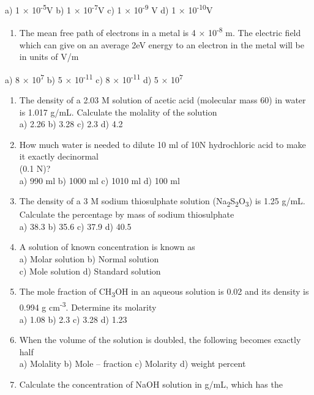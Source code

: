 a) 1 × 10\textsuperscript{-5}V b) 1 × 10\textsuperscript{-7}V c) 1 ×
10\textsuperscript{-9} V d) 1 × 10\textsuperscript{-10}V

\begin{enumerate}
\def\labelenumi{\arabic{enumi}.}
\setcounter{enumi}{43}
\item
  The mean free path of electrons in a metal is 4 ×
  10\textsuperscript{-8} m. The electric field which can give on an
  average 2eV energy to an electron in the metal will be in units of V/m
\end{enumerate}

a) 8 × 10\textsuperscript{7} b) 5 × 10\textsuperscript{-11} c) 8 ×
10\textsuperscript{-11} d) 5 × 10\textsuperscript{7}

\begin{enumerate}
\def\labelenumi{\arabic{enumi}.}
\setcounter{enumi}{45}
\item
  The density of a 2.03 M solution of acetic acid (molecular mass 60) in
  water is 1.017 g/mL. Calculate the molality of the solution\\
  a) 2.26 b) 3.28 c) 2.3 d) 4.2
\item
  How much water is needed to dilute 10 ml of 10N hydrochloric acid to
  make it exactly decinormal\\
  (0.1 N)?\\
  a) 990 ml b) 1000 ml c) 1010 ml d) 100 ml
\item
  The density of a 3 M sodium thiosulphate solution
  (Na\textsubscript{2}S\textsubscript{2}O\textsubscript{3}) is 1.25
  g/mL. Calculate the percentage by mass of sodium thiosulphate\\
  a) 38.3 b) 35.6 c) 37.9 d) 40.5
\item
  A solution of known concentration is known as\\
  a) Molar solution b) Normal solution\\
  c) Mole solution d) Standard solution
\item
  The mole fraction of CH\textsubscript{3}OH in an aqueous solution is
  0.02 and its density is 0.994 g cm\textsuperscript{-3}. Determine its
  molarity\\
  a) 1.08 b) 2.3 c) 3.28 d) 1.23
\item
  When the volume of the solution is doubled, the following becomes
  exactly half\\
  a) Molality b) Mole -- fraction c) Molarity d) weight percent
\item
  Calculate the concentration of NaOH solution in g/mL, which has the

\end{enumerate}

